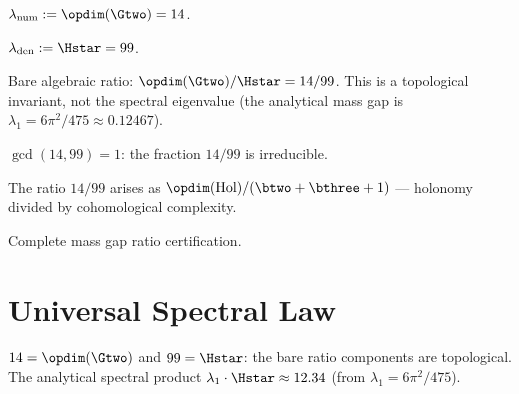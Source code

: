 \begin{definition}\label{def:mgr_num}
    \leanok
    $\lambda_{\mathrm{num}} := \opdim(\Gtwo) = 14$.
\end{definition}

\begin{definition}\label{def:mgr_den}
    \leanok
    $\lambda_{\mathrm{den}} := \Hstar = 99$.
\end{definition}

\begin{definition}\label{def:mgr}
    \leanok
    Bare algebraic ratio: $\opdim(\Gtwo) / \Hstar = 14/99$.
    This is a topological invariant, not the spectral eigenvalue
    (the analytical mass gap is $\lambda_1 = 6\pi^2/475 \approx 0.12467$).
\end{definition}

\begin{theorem}\label{thm:mgr_irred}
    \leanok
    $\gcd(14, 99) = 1$: the fraction $14/99$ is irreducible.
\end{theorem}

\begin{theorem}\label{thm:mgr_holonomy}
    \leanok
    The ratio $14/99$ arises as $\opdim(\mathrm{Hol}) / (\btwo + \bthree + 1)$
    --- holonomy divided by cohomological complexity.
\end{theorem}

\begin{theorem}\label{thm:mgr_cert}
    \leanok
    Complete mass gap ratio certification.
\end{theorem}

\section{Universal Spectral Law}

\begin{theorem}\label{thm:product_formula}
    \leanok
    $14 = \opdim(\Gtwo)$ and $99 = \Hstar$: the bare ratio components are topological.
    The analytical spectral product $\lambda_1 \cdot \Hstar \approx 12.34$ (from $\lambda_1 = 6\pi^2/475$).
\end{theorem}

